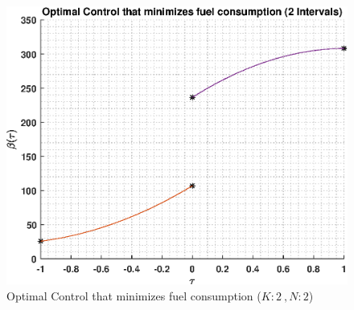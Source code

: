 \documentclass[]{article}
\begin{document}
\begin{figure}
	\centering
	\includegraphics[scale=0.75]{directControlK2Poly2.eps}
	\caption{Optimal Control that minimizes fuel consumption (\(K:2\ , N:2\))}
	\label{fig:directControlK2Poly2}
\end{figure}
\FloatBarrier
\end{document}
